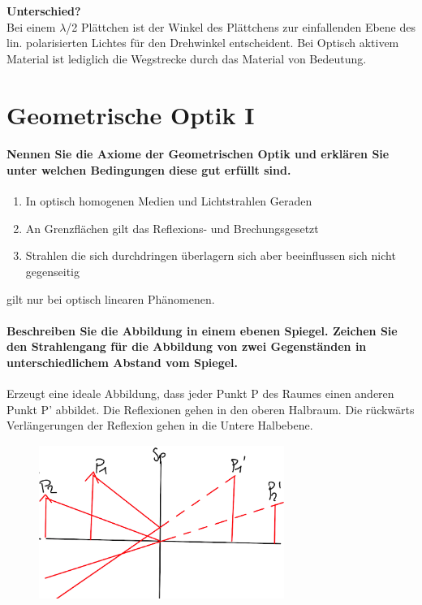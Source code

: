\documentclass[a4paper, 11pt, ngerman, parskip=half-]{scrartcl}
\begin{document}
\textbf{Unterschied?}\\
Bei einem $\lambda$/2 Plättchen ist der Winkel des Plättchens zur einfallenden Ebene des lin. polarisierten Lichtes für den Drehwinkel entscheident. 
Bei Optisch aktivem Material ist lediglich die Wegstrecke durch das Material von Bedeutung. 

\newpage

\section{Geometrische Optik I}


\paragraph{Nennen Sie die Axiome der Geometrischen Optik und erklären Sie unter welchen Bedingungen
diese gut erfüllt sind.}

\begin{enumerate}
\item In optisch homogenen Medien und Lichtstrahlen Geraden
\item An Grenzflächen gilt das Reflexions- und Brechungsgesetzt
\item Strahlen die sich durchdringen überlagern sich aber beeinflussen sich nicht gegenseitig
\end{enumerate}
 
gilt nur bei optisch linearen Phänomenen.

\paragraph{Beschreiben Sie die Abbildung in einem ebenen Spiegel. Zeichen Sie den Strahlengang für
die Abbildung von zwei Gegenständen in unterschiedlichem Abstand vom Spiegel.}

Erzeugt eine ideale Abbildung, dass jeder Punkt P des Raumes einen anderen Punkt P' abbildet. Die Reflexionen gehen in den oberen Halbraum.  Die rückwärts Verlängerungen der Reflexion gehen in die Untere Halbebene.

\begin{figure}[H]
    \centering
    \includegraphics[width=8cm]{image/17/geo12}
\end{figure}
\end{document}
